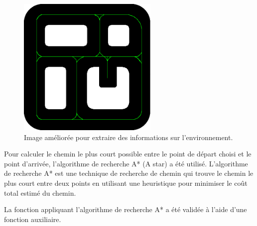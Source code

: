 \begin{figure}[!h]
    \centering
    \includegraphics[width=0.6\textwidth]{img/background/track_improove.png} 
    \caption{Image améliorée pour extraire des informations sur l'environnement.}
    \label{imgff}
\end{figure}



Pour calculer le chemin le plus court possible entre le point de départ choisi et le point d'arrivée, l'algorithme de recherche A* (A star) a été utilisé. L'algorithme de recherche A* est une technique de recherche de chemin qui trouve le chemin le plus court entre deux points en utilisant une heuristique pour minimiser le coût total estimé du chemin.

La fonction appliquant l'algorithme de recherche A* a été validée à l'aide d'une fonction auxiliaire.






